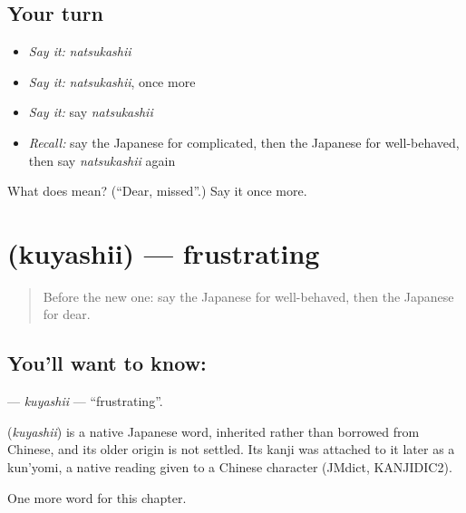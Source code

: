 \subsection*{Your turn}
\begin{itemize}
\raggedright
  \item \emph{Say it:} \emph{natsukashii}
  \item \emph{Say it:} \emph{natsukashii}, once more
  \item \emph{Say it:} say \emph{natsukashii}
  \item \emph{Recall:} say the Japanese for complicated, then the Japanese for well-behaved, then say \emph{natsukashii} again
\end{itemize}

\begin{tcolorbox}[breakable,colback=teal!4,colframe=teal!35!black,title={Before you move on}]
What does  mean? (\textquotedblleft{}Dear, missed\textquotedblright{}.) Say it once more.
\end{tcolorbox}
\section[\texorpdfstring{\ja{くやしい} (kuyashii)}{くやしい (kuyashii)}]{ (kuyashii) — frustrating}

\label{lesson:JA-C123-kuyashii}



\begin{quote}
Before the new one: say the Japanese for well-behaved, then the Japanese for dear.
\end{quote}

\subsection*{You'll want to know: }
\textbf{} — \emph{kuyashii} — \textquotedblleft{}frustrating\textquotedblright{}.

\begin{cousinweb}
\textbf{} (\emph{kuyashii}) is a native Japanese word, inherited rather than borrowed from Chinese, and its older origin is not settled. Its kanji was attached to it later as a kun'yomi, a native reading given to a Chinese character (JMdict, KANJIDIC2).
\end{cousinweb}

\begin{grammarlens}[title={What you've built}]
One more word for this chapter.
\end{grammarlens}

